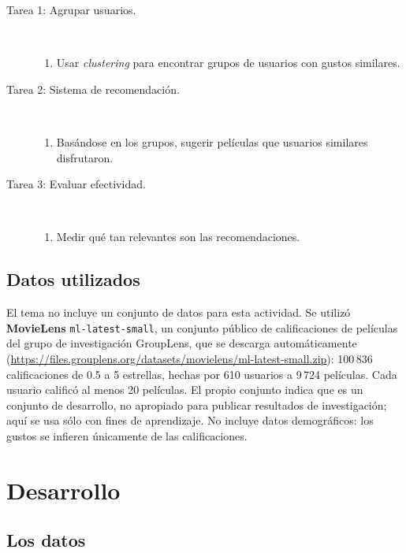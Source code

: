 \documentclass[11pt,letterpaper]{article}
\begin{document}
\begin{description}
    \item[Tarea 1: Agrupar usuarios.]\mbox{}\\[-1.3\baselineskip]
    \begin{enumerate}
        \item Usar \textit{clustering} para encontrar grupos de usuarios con gustos similares.
    \end{enumerate}
    \item[Tarea 2: Sistema de recomendación.]\mbox{}\\[-1.3\baselineskip]
    \begin{enumerate}
        \item Basándose en los grupos, sugerir películas que usuarios similares disfrutaron.
    \end{enumerate}
    \item[Tarea 3: Evaluar efectividad.]\mbox{}\\[-1.3\baselineskip]
    \begin{enumerate}
        \item Medir qué tan relevantes son las recomendaciones.
    \end{enumerate}
\end{description}

\subsection*{Datos utilizados}

El tema no incluye un conjunto de datos para esta actividad. Se utilizó \textbf{MovieLens} \texttt{ml-latest-small}, un conjunto público de calificaciones de películas del grupo de investigación GroupLens, que se descarga automáticamente (\url{https://files.grouplens.org/datasets/movielens/ml-latest-small.zip}): 100\,836 calificaciones de 0.5 a 5 estrellas, hechas por 610 usuarios a 9\,724 películas. Cada usuario calificó al menos 20 películas. El propio conjunto indica que es un conjunto de desarrollo, no apropiado para publicar resultados de investigación; aquí se usa sólo con fines de aprendizaje. No incluye datos demográficos: los gustos se infieren únicamente de las calificaciones.

\newpage
\section{Desarrollo}

\subsection{Los datos}
\end{document}
